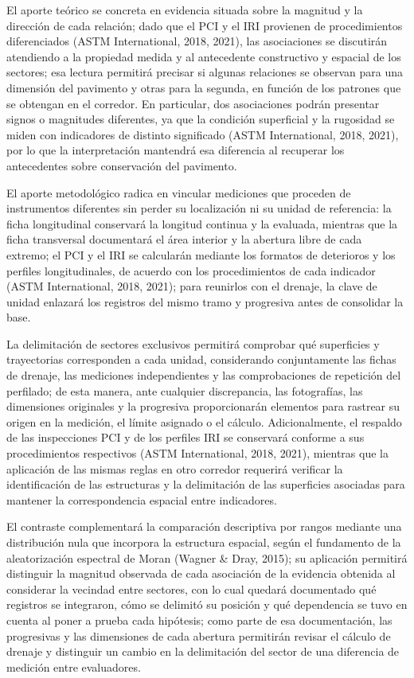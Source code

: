 El aporte teórico se concreta en evidencia situada sobre la magnitud y la dirección de cada relación; dado que el PCI y el IRI provienen de procedimientos diferenciados (ASTM International, 2018, 2021), las asociaciones se discutirán atendiendo a la propiedad medida y al antecedente constructivo y espacial de los sectores; esa lectura permitirá precisar si algunas relaciones se observan para una dimensión del pavimento y otras para la segunda, en función de los patrones que se obtengan en el corredor. En particular, dos asociaciones podrán presentar signos o magnitudes diferentes, ya que la condición superficial y la rugosidad se miden con indicadores de distinto significado (ASTM International, 2018, 2021), por lo que la interpretación mantendrá esa diferencia al recuperar los antecedentes sobre conservación del pavimento.


El aporte metodológico radica en vincular mediciones que proceden de instrumentos diferentes sin perder su localización ni su unidad de referencia: la ficha longitudinal conservará la longitud continua y la evaluada, mientras que la ficha transversal documentará el área interior y la abertura libre de cada extremo; el PCI y el IRI se calcularán mediante los formatos de deterioros y los perfiles longitudinales, de acuerdo con los procedimientos de cada indicador (ASTM International, 2018, 2021); para reunirlos con el drenaje, la clave de unidad enlazará los registros del mismo tramo y progresiva antes de consolidar la base.

La delimitación de sectores exclusivos permitirá comprobar qué superficies y trayectorias corresponden a cada unidad, considerando conjuntamente las fichas de drenaje, las mediciones independientes y las comprobaciones de repetición del perfilado; de esta manera, ante cualquier discrepancia, las fotografías, las dimensiones originales y la progresiva proporcionarán elementos para rastrear su origen en la medición, el límite asignado o el cálculo. Adicionalmente, el respaldo de las inspecciones PCI y de los perfiles IRI se conservará conforme a sus procedimientos respectivos (ASTM International, 2018, 2021), mientras que la aplicación de las mismas reglas en otro corredor requerirá verificar la identificación de las estructuras y la delimitación de las superficies asociadas para mantener la correspondencia espacial entre indicadores.

El contraste complementará la comparación descriptiva por rangos mediante una distribución nula que incorpora la estructura espacial, según el fundamento de la aleatorización espectral de Moran (Wagner \& Dray, 2015); su aplicación permitirá distinguir la magnitud observada de cada asociación de la evidencia obtenida al considerar la vecindad entre sectores, con lo cual quedará documentado qué registros se integraron, cómo se delimitó su posición y qué dependencia se tuvo en cuenta al poner a prueba cada hipótesis; como parte de esa documentación, las progresivas y las dimensiones de cada abertura permitirán revisar el cálculo de drenaje y distinguir un cambio en la delimitación del sector de una diferencia de medición entre evaluadores.

